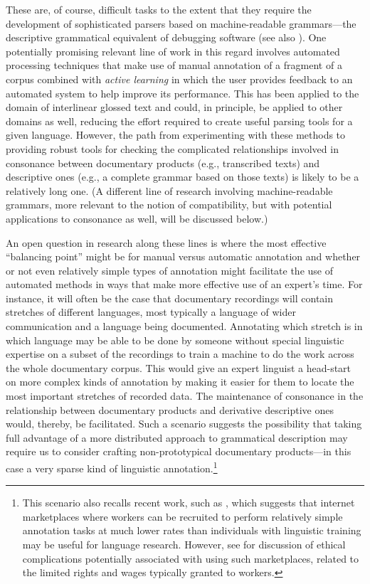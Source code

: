 These are, of course, difficult tasks to the extent that they require the
development of sophisticated parsers based on machine-readable grammars---the
descriptive grammatical equivalent of debugging software (see also
). One potentially promising relevant line of work in
this regard involves automated processing techniques that make use of manual
annotation of a fragment of a corpus combined with \emph{active learning} in
which the user provides feedback to an automated system to help improve its
performance. This has been applied to the domain of interlinear glossed text
\citep{BaldridgePalmer:2009,PalmerEtAl:2009,Palmer:2009,PalmerEtAl:2010} and
could, in principle, be applied to other domains as well, reducing the effort
required to create useful parsing tools for a given language. However, the path
from experimenting with these methods to providing robust tools for checking the
complicated relationships involved in consonance between documentary products
(e.g., transcribed texts) and descriptive ones (e.g., a complete grammar based
on those texts) is likely to be a relatively long one. (A different line of
research involving machine-readable grammars, more relevant to the notion of
compatibility, but with potential applications to consonance as well, will be
discussed below.)

An open question in research along these lines is where the most effective
``balancing point'' might be for manual versus automatic annotation and whether
or not even relatively simple types of annotation might facilitate the use of
automated methods in ways that make more effective use of an expert's time. For
instance, it will often be the case that documentary recordings will contain
stretches of different languages, most typically a language of wider
communication and a language being documented. Annotating which stretch is in
which language may be able to be done by someone without special linguistic
expertise on a subset of the recordings to train a machine to do the work across
the whole documentary corpus. This would give an expert linguist a head-start on
more complex kinds of annotation by making it easier for them to locate the most
important stretches of recorded data. The maintenance of consonance in the
relationship between documentary products and derivative descriptive ones would,
thereby, be facilitated. Such a scenario suggests the possibility that taking
full advantage of a more distributed approach to grammatical description may
require us to consider crafting non-prototypical documentary products---in this
case a very sparse kind of linguistic annotation.{\footnote{This scenario also
recalls recent work, such as , which suggests that
internet marketplaces where workers can be recruited to perform relatively
simple annotation tasks at much lower rates than individuals with linguistic
training may be useful for language research. However, see
 for discussion of ethical complications potentially
associated with using such marketplaces, related to the limited rights and wages
typically granted to workers.}}




